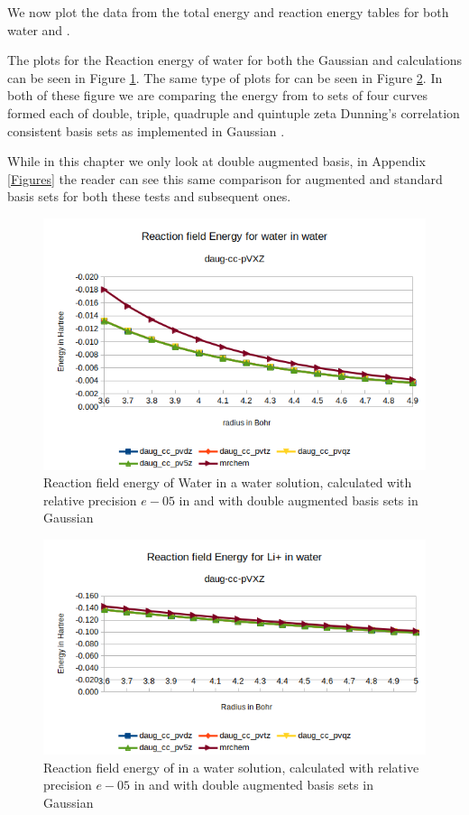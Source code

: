 \documentclass[../master_thesis.tex]{subfiles}
\begin{document}
We now plot the data from the total energy and reaction energy tables for
both water and .

The plots for the Reaction energy of water for
both the Gaussian and  \mrchem calculations can be seen in Figure \ref{fig:watEnergyplotsdaug}.
The same type of plots for  can be seen in Figure \ref{fig:lipEnergyplotsdaug}.
In both of these figure we are comparing the energy from \mrchem to sets of four
curves formed each of double, triple, quadruple and quintuple zeta Dunning's correlation
consistent \cite{doi:10.1063/1.456153} basis sets as implemented in Gaussian \cite{G09}.

While in this chapter we only look at double augmented basis, in Appendix \ref{Figures}
the reader can see this same comparison for augmented and standard basis sets for
both these tests and subsequent ones.


\begin{figure}[h!]
  \centering
    \includegraphics[width=0.75\linewidth]{img/Erdaugwat.png}
  \caption{Reaction field energy of Water in a water solution, calculated with relative precision $e-05$ in \mrchem and with double augmented basis sets in Gaussian}
  \label{fig:watEnergyplotsdaug}
\end{figure}

\begin{figure}[h!]
  \centering
    \includegraphics[width=0.75\linewidth]{img/Erdauglip.png}
  \caption{Reaction field energy of  in a water solution, calculated with relative precision $e-05$ in \mrchem  and with double augmented basis sets in Gaussian}
  \label{fig:lipEnergyplotsdaug}
\end{figure}
\end{document}
